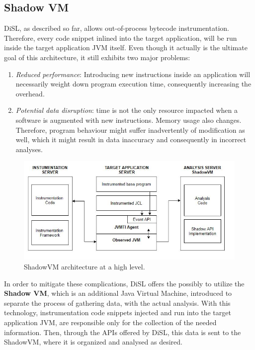 \documentclass[]{usiinfthesis}
\begin{document}
\subsection{Shadow VM}


DiSL, as described so far, allows out-of-process bytecode instrumentation. Therefore, every code snippet inlined into the target application, will be run inside the target application JVM itself. Even though it actually is the ultimate goal of this architecture, it still exhibits two major problems:
\begin{enumerate}
    \item \textit{Reduced performance}: Introducing new instructions inside an application will necessarily weight down program execution time, consequently increasing the overhead.
    \item \textit{Potential data disruption}: time is not the only resource impacted when a software is augmented with new instructions. Memory usage also changes. Therefore, program behaviour might suffer inadvertently of modification as well, which it might result in data inaccuracy and consequently in incorrect analyses.
\end{enumerate}


\begin{figure}[h]
    \centering
    \includegraphics[scale=0.7]{Immagini/DiSL_Architecture.JPG} 
    \caption{ShadowVM architecture at a high level.}
    \label{fig:fig1}
\end{figure}

In order to mitigate these complications, DiSL offers the possibly to utilize the \textbf{Shadow VM}, which is an additional Java Virtual Machine, introduced to separate the process of gathering data, with the actual analysis. With this technology, instrumentation code snippets injected and run into the target application JVM, are responsible only for the collection of the needed information. Then, through the APIs offered by DiSL, this data is sent to the ShadowVM, where it is organized and analysed as desired. 
\end{document}
